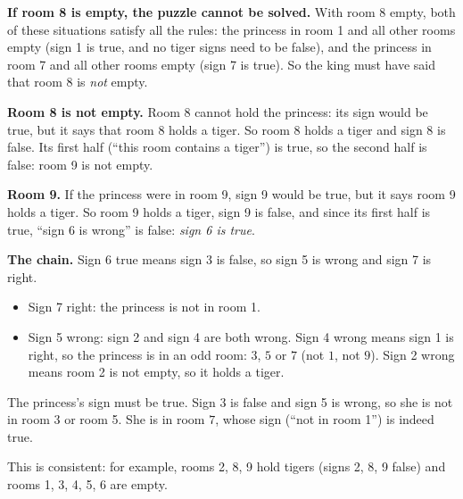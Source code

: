 \textbf{If room 8 is empty, the puzzle cannot be solved.} With room 8 empty, both of these situations satisfy all the rules: the princess in room 1 and all other rooms empty (sign 1 is true, and no tiger signs need to be false), and the princess in room 7 and all other rooms empty (sign 7 is true). So the king must have said that room 8 is \emph{not} empty.

\textbf{Room 8 is not empty.} Room 8 cannot hold the princess: its sign would be true, but it says that room 8 holds a tiger. So room 8 holds a tiger and sign 8 is false. Its first half (``this room contains a tiger'') is true, so the second half is false: room 9 is not empty.

\textbf{Room 9.} If the princess were in room 9, sign 9 would be true, but it says room 9 holds a tiger. So room 9 holds a tiger, sign 9 is false, and since its first half is true, ``sign 6 is wrong'' is false: \emph{sign 6 is true}.

\textbf{The chain.} Sign 6 true means sign 3 is false, so sign 5 is wrong and sign 7 is right.
\begin{itemize}
\item Sign 7 right: the princess is not in room 1.
\item Sign 5 wrong: sign 2 and sign 4 are both wrong. Sign 4 wrong means sign 1 is right, so the princess is in an odd room: $3$, $5$ or $7$ (not $1$, not $9$). Sign 2 wrong means room 2 is not empty, so it holds a tiger.
\end{itemize}
The princess's sign must be true. Sign 3 is false and sign 5 is wrong, so she is not in room 3 or room 5. She is in room $\boxed{7}$, whose sign (``not in room 1'') is indeed true.

This is consistent: for example, rooms 2, 8, 9 hold tigers (signs 2, 8, 9 false) and rooms 1, 3, 4, 5, 6 are empty.
